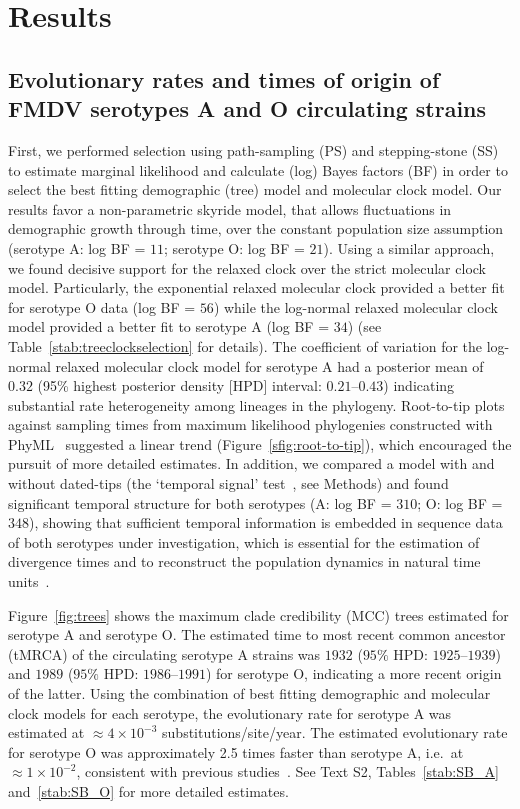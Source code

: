 \documentclass[10pt]{article}
\begin{document}
\section*{Results}

\subsection*{Evolutionary rates and times of origin of FMDV serotypes A and O circulating strains}

First, we performed selection using path-sampling (PS) and stepping-stone (SS) to estimate marginal likelihood and calculate (log) Bayes factors (BF) in order to select the best fitting demographic (tree) model and molecular clock model.
Our results favor a non-parametric skyride model, that allows fluctuations in demographic growth through time, over the constant population size assumption (serotype A: log BF = $11$; serotype O: log BF = $21$).
Using a similar approach, we  found decisive support for the relaxed clock over the strict molecular clock model.
Particularly, the exponential relaxed molecular clock provided a better fit for serotype O data (log BF = $56$) while the log-normal relaxed molecular clock model provided a better fit to serotype A (log BF = $34$) (see Table~\ref{stab:treeclockselection} for details). 
The coefficient of variation for the log-normal relaxed molecular clock model for serotype A had a posterior mean of $0.32$ (95\% highest posterior density [HPD] interval: $0.21$--$0.43$) indicating substantial rate heterogeneity among lineages in the phylogeny.
Root-to-tip plots against sampling times from maximum likelihood phylogenies constructed with PhyML~\cite{phyml} suggested a linear trend (Figure~\ref{sfig:root-to-tip}), which encouraged the pursuit of more detailed estimates.
In addition, we compared a model with and without dated-tips (the `temporal signal' test~\cite{Faria2012, Baele2012}, see Methods) and found significant temporal structure for both serotypes (A: log BF = $310$; O: log BF = $348$), showing that sufficient temporal information is embedded in sequence data of both serotypes under investigation, which is essential for the estimation of divergence times and to reconstruct the population dynamics in natural time units~\cite{MEP}. 

Figure~\ref{fig:trees} shows the maximum clade credibility (MCC) trees estimated for serotype A and serotype O.
The estimated time to most recent common ancestor (tMRCA) of the circulating serotype A strains was $1932$ ($95\%$ HPD: $1925$--$1939$) and  $1989$ ($95\%$ HPD: $ 1986$--$1991$) for serotype O, indicating a more recent origin of the latter. 
Using the combination of best fitting demographic and molecular clock models for each serotype, the evolutionary rate for serotype A was estimated at $\approx 4 \times 10^{-3}$ substitutions/site/year.
The estimated evolutionary rate for serotype O was approximately 2.5 times faster than serotype A, i.e.~at $\approx 1 \times 10^{-2}$, consistent with previous studies~\cite{tully, Carvalho2013, Muellner2011}.
See Text S2, Tables~\ref{stab:SB_A} and~\ref{stab:SB_O} for more detailed estimates.
\end{document}
